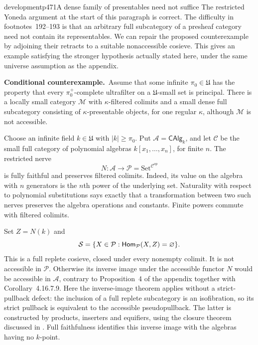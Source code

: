 
\begin{dcomment}{development}{p471}{A dense family of presentables need not suffice}
The restricted Yoneda argument at the start of this paragraph is correct. The difficulty in footnotes~192--193 is that an arbitrary full subcategory of a presheaf category need not contain its representables. We can repair the proposed counterexample by adjoining their retracts to a suitable nonaccessible cosieve. This gives an example satisfying the stronger hypothesis actually stated here, under the same universe assumption as the appendix.

\textbf{Conditional counterexample.}\ours\
Assume that some infinite $\pi_0\in\mathfrak U$ has the property that every $\pi_0^+$-complete ultrafilter on a $\mathfrak U$-small set is principal. There is a locally small category $\mathcal M$ with $\kappa$-filtered colimits and a small dense full subcategory consisting of $\kappa$-presentable objects, for one regular $\kappa$, although $\mathcal M$ is not accessible.

Choose an infinite field $k\in\mathfrak U$ with $|k|\ge\pi_0$. Put $\mathcal A=\mathsf{CAlg}_k$, and let $\mathcal C$ be the small full category of polynomial algebras $k[x_1,\ldots,x_n]$, for finite $n$. The restricted nerve
\[
 N:\mathcal A\longrightarrow\mathcal P=\mathrm{Set}^{\mathcal C^{op}}
\]
is fully faithful and preserves filtered colimits. Indeed, its value on the algebra with $n$ generators is the $n$th power of the underlying set. Naturality with respect to polynomial substitutions says exactly that a transformation between two such nerves preserves the algebra operations and constants. Finite powers commute with filtered colimits.

Set $Z=N(k)$ and
\[
 \mathcal S=\{X\in\mathcal P:\mathsf{Hom}_{\mathcal P}(X,Z)=\varnothing\}.
\]
This is a full replete cosieve, closed under every nonempty colimit. It is not accessible in $\mathcal P$. Otherwise its inverse image under the accessible functor $N$ would be accessible in $\mathcal A$, contrary to Proposition~4 of the appendix together with Corollary~4.16.7.9. Here the inverse-image theorem applies without a strict-pullback defect: the inclusion of a full replete subcategory is an isofibration, so its strict pullback is equivalent to the accessible pseudopullback. The latter is constructed by products, inserters and equifiers, using the closure theorem discussed in \citet[Appendix~A]{ChingRiehl2014}. Full faithfulness identifies this inverse image with the algebras having no $k$-point.


\end{dcomment}
